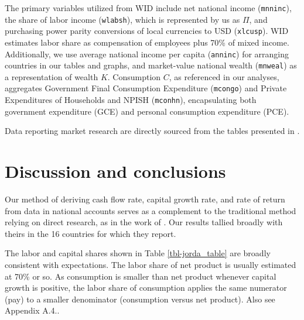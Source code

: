 \documentclass[a4paper,fleqn]{cas-sc}
\begin{document}
The primary variables utilized from WID include net national income (\texttt{mnninc}), the share of labor income (\texttt{wlabsh}), which is represented by us as \(\Pi\), and purchasing power parity conversions of local currencies to USD (\texttt{xlcusp}). WID estimates labor share as compensation of employees plus 70\% of mixed income. Additionally, we use average national income per capita (\texttt{anninc}) for arranging countries in our tables and graphs, and market-value national wealth (\texttt{mnweal}) as a representation of wealth $K$. Consumption $C$, as referenced in our analyses, aggregates Government Final Consumption Expenditure (\texttt{mcongo}) and Private Expenditures of Households and NPISH (\texttt{mconhn}), encapsulating both government expenditure (GCE) and personal consumption expenditure (PCE).

Data reporting market research are directly sourced from the tables presented in \cite{jorda2019}.


\section{Discussion and conclusions}

Our method of deriving cash flow rate, capital growth rate, and rate of return from data in national accounts serves as a complement to the traditional method relying on direct research, as in the work of \cite{jorda2019}. Our results tallied broadly with theirs in the 16 countries for which they report.

The labor and capital shares shown in Table \ref{tbl-jorda_table} are broadly consistent with expectations. The labor share of net product is usually estimated at 70\% or so. As consumption is smaller than net product whenever capital growth is positive, the labor share of consumption applies the same numerator (pay) to a smaller denominator (consumption versus net product). Also see Appendix A.4..



\renewcommand{\theequation}{A.\arabic{equation}}
\setcounter{equation}{0}
\end{document}
